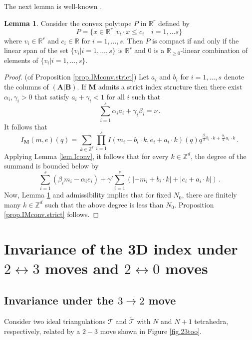 \documentclass[12pt]{amsart}
\theoremstyle{definition}
\newtheorem{lemma}[theorem]{Lemma}
\def\BZ{\mathbb Z}
\def\BR{\mathbb R}
\def\calT{\mathcal T}
\def\a{\alpha}
\def\ga{\gamma}
\def\b{\beta}
\newcommand{\mb}{\mathbf}
\newcommand{\wt}{\widetilde}
\numberwithin{equation}{section}
\begin{document}
The next lemma is well-known \cite{Ziegler}.

\begin{lemma}
\label{lem.Pv}
Consider the convex polytope $P$ in $\BR^r$ defined by
$$
P=\{ x \in \BR^r \, | v_i \cdot x \leq c_i \quad i=1,\dots s \} \,
$$
where $v_i \in \BR^r$ and $c_i \in \BR$ for $i=1,\dots,s$. Then $P$
is compact if and only if the linear span of the set $\{v_i| i=1,\dots,s\}$
is $\BR^r$ and $0$ is a $\BR_{\geq 0}$-linear combination of elements of
$\{v_i| i=1,\dots,s\}$.
\end{lemma}

\begin{proof}(of Proposition \ref{prop.IMconv.strict})
Let $a_i$ and $b_i$ for $i=1,\dots,s$ denote the columns of $(\mb A|\mb B)$.
If $\mb M$ admits a strict index structure then there exist $\a_i, \ga_i >0$
that satisfy $a_i + \ga_i < 1$ for all $i$ such that
$$
\sum_{i=1}^s \a_i a_i + \ga_i \b_i = \nu \,.
$$
It follows that
$$
I_{\mb M}(m,e)(q)=\sum_{k \in \BZ^r}
\prod_{i=1}^s I(m_i-b_i \cdot k, e_i+a_i \cdot k)(q) 
q^{\frac{\b_i}{2} b_i \cdot k + \frac{\a_i}{2} a_i \cdot k} \,. 
$$
Applying Lemma \ref{lem.Iconv}, it follows that for every $k \in \BZ^d$,
the degree of the summand is bounded below by
$$
\sum_{i=1}^s \left( \b_i m_i - \a_i e_i \right)
+ \ga' \sum_{i=1}^s \left( |-m_i+b_i \cdot k| +|e_i+a_i \cdot k| \right)  
\,.
$$
Now, Lemma \ref{lem.Pv} and admissibility implies that for fixed $N_0$,
there are finitely many $k \in \BZ^d$ such that the above degree is
less than $N_0$. Proposition \ref{prop.IMconv.strict} follows. 
\end{proof}


\section{Invariance of the 3D index under $2\leftrightarrow
3$ moves and $2\leftrightarrow 0$ moves}
\label{sec.23}

\subsection{Invariance under the $3\to 2$ move}
\label{sub.3-2}

Consider two ideal triangulations $\calT$ and $\wt{\calT}$ with $N$ and $N+1$
tetrahedra, respectively, related by a $2-3$ move shown in Figure 
\ref{fig.23too}.
\end{document}
